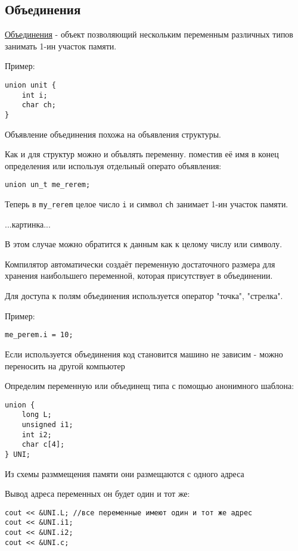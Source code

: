 \subsection{Объединения}

\underline{Объединения} - объект позволяющий нескольким переменным различных типов занимать 1-ин участок памяти.

Пример:

\begin{verbatim}
union unit {
    int i;
    char ch;
}
\end{verbatim}

Объявление объединения похожа на объявления структуры.

Как и для структур можно и объвлять переменну. поместив её имя в конец определения или используя отдельный операто объявления:

\begin{verbatim}
union un_t me_rerem;
\end{verbatim}

Теперь в \texttt{my\_rerem} целое число \texttt{i} и символ \texttt{ch} занимает 1-ин участок памяти.

...картинка...

В этом случае можно обратится к данным как к целому числу или символу.

Компилятор автоматически создаёт переменную достаточного размера для хранения наибольшего переменной, которая присутствует в объединении.

Для доступа к полям объединения используется оператор "точка", "стрелка".

Пример:

\begin{verbatim}
me_perem.i = 10;
\end{verbatim}

Если используется объединения код становится машино не зависим - можно переносить на другой компьютер

Определим переменную или объединещ типа с помощью анонимного шаблона:

\begin{verbatim}
union {
    long L;
    unsigned i1;
    int i2;
    char c[4];
} UNI;
\end{verbatim}

Из схемы разммещения памяти они размещаются с одного адреса

Вывод адреса переменных он будет один и тот же:

\begin{verbatim}
cout << &UNI.L; //все переменные имеют один и тот же адрес
cout << &UNI.i1;
cout << &UNI.i2;
cout << &UNI.c;
\end{verbatim}

